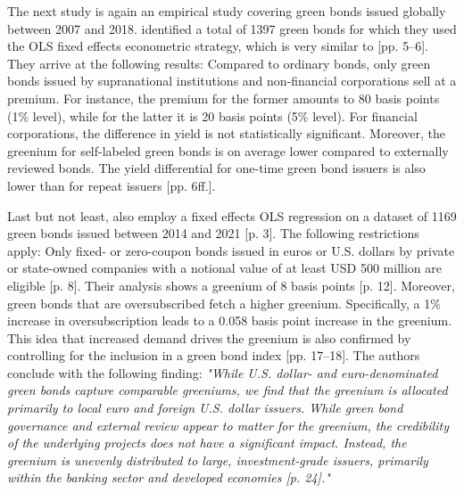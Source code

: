 The next study is again an empirical study covering green bonds issued globally between 2007 and 2018. \citet{fatica2021pricing} identified a total of 1397 green bonds for which they used the OLS fixed effects econometric strategy, which is very similar to \citet{baker2018financing} [pp. 5--6]. They arrive at the following results: Compared to ordinary bonds, only green bonds issued by supranational institutions and non-financial corporations sell at a premium. For instance, the premium for the former amounts to 80 basis points (1\% level), while for the latter it is 20 basis points (5\% level). For financial corporations, the difference in yield is not statistically significant. Moreover, the greenium for self-labeled green bonds is on average lower compared to externally reviewed bonds. The yield differential for one-time green bond issuers is also lower than for repeat issuers [pp. 6ff.].

Last but not least, \citet{caramichael2022green} also employ a fixed effects OLS regression on a dataset of 1169 green bonds issued between 2014 and 2021 [p. 3]. The following restrictions apply: Only fixed- or zero-coupon bonds issued in euros or U.S. dollars by private or state-owned companies with a notional value of at least USD 500 million are eligible [p. 8].
Their analysis shows a greenium of 8 basis points [p. 12]. Moreover, green bonds that are oversubscribed fetch a higher greenium. Specifically, a 1\% increase in oversubscription leads to a 0.058 basis point increase in the greenium. This idea that increased demand drives the greenium is also confirmed by controlling for the inclusion in a green bond index [pp. 17--18]. The authors conclude with the following finding: \textit{"While U.S. dollar- and euro-denominated green bonds capture comparable greeniums, we find that the greenium is allocated primarily to local euro and foreign U.S. dollar issuers. While green bond governance and external review appear to matter for the greenium, the credibility of the underlying projects does not have a significant impact. Instead, the greenium is unevenly distributed to large, investment-grade issuers, primarily within the banking sector and developed economies [p. 24]." }